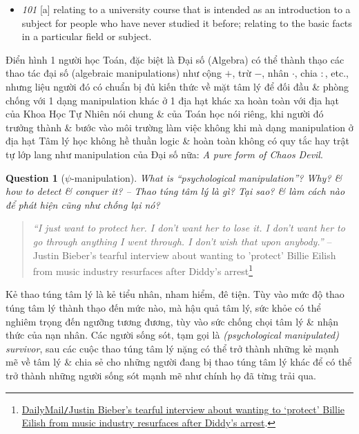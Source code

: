 \documentclass[12pt,oneside]{book}
\newtheorem{question}{Question}
\begin{document}
\begin{itemize}\small\sf
	\item {\it101} [a] relating to a university course that is intended as an introduction to a subject for people who have never studied it before; relating to the basic facts in a particular field or subject.
\end{itemize}
Điển hình 1 người học Toán, đặc biệt là Đại số (Algebra) có thể thành thạo các thao tác đại số (algebraic manipulations) như cộng $+$, trừ $-$, nhân $\cdot$, chia $:$, etc., nhưng liệu người đó có chuẩn bị đủ kiến thức về mặt tâm lý để đối đầu \& phòng chống với 1 dạng manipulation khác ở 1 địa hạt khác xa hoàn toàn với địa hạt của Khoa Học Tự Nhiên nói chung \& của Toán học nói riêng, khi người đó trưởng thành \& bước vào môi trường làm việc không khi mà dạng manipulation ở địa hạt Tâm lý học không hề thuần logic \& hoàn toàn không có quy tắc hay trật tự lớp lang như manipulation của Đại số nữa: {\it A pure form of Chaos Devil}.

\begin{question}[$\psi$-manipulation]
	What is ``psychological manipulation''? Why? \& how to detect \& conquer it? -- Thao túng tâm lý là gì? Tại sao? \& làm cách nào để phát hiện cũng như chống lại nó?
\end{question}

\begin{quotation}
	{\it``I just want to protect her. I don't want her to lose it. I don't want her to go through anything I went through. I don't wish that upon anybody.''} -- {\sc Justin Bieber}'s tearful interview about wanting to 'protect' {\sc Billie Eilish} from music industry resurfaces after Diddy's arrest\footnote{\href{https://www.dailymail.co.uk/news/article-13885907/justin-bieber-tearful-interview-resurface-billie-eilish-diddy-arrest.html}{DailyMail{\tt/}{\sc Justin Bieber}'s tearful interview about wanting to `protect' {\sc Billie Eilish} from music industry resurfaces after Diddy's arrest}.}
\end{quotation}
Kẻ thao túng tâm lý là kẻ tiểu nhân, nham hiểm, đê tiện. Tùy vào mức độ thao túng tâm lý thành thạo đến mức nào, mà hậu quả tâm lý, sức khỏe có thể nghiêm trọng đến ngưỡng tương đương, tùy vào sức chống chọi tâm lý \& nhận thức của nạn nhân. Các người sống sót, tạm gọi là {\it (psychological manipulated) survivor}, sau các cuộc thao túng tâm lý nặng có thể trở thành những kẻ mạnh mẽ về tâm lý \& chia sẻ cho những người đang bị thao túng tâm lý khác để có thể trở thành những người sống sót mạnh mẽ như chính họ đã từng trải qua.
\end{document}
